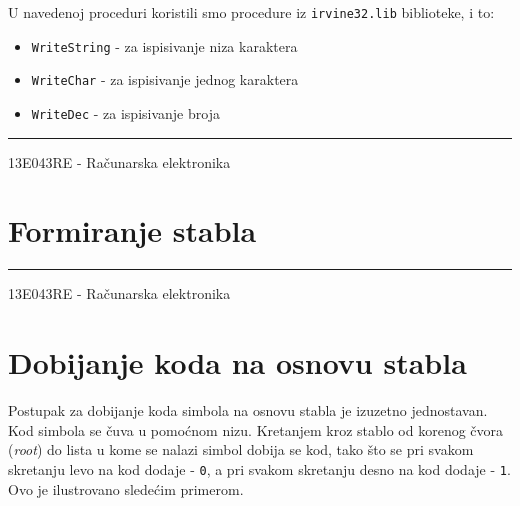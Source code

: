 \documentclass[a4paper, 12pt]{article}
\newcommand{\btmline}{
\vfill
\rule{0.9\textwidth}{0.4mm}
\begin{center}
13E043RE - Računarska elektronika
\end{center}}
\begin{document}
U navedenoj proceduri koristili smo procedure iz \verb|irvine32.lib| biblioteke, i to: 
\begin{itemize}
\setlength\itemsep{0.1em}
\item \verb|WriteString| - za ispisivanje niza karaktera
\item \verb|WriteChar| - za ispisivanje jednog karaktera
\item \verb|WriteDec| - za ispisivanje broja
\end{itemize}

\btmline\newpage

\section*{Formiranje stabla}

\btmline\newpage

\section*{Dobijanje koda na osnovu stabla}

Postupak za dobijanje koda simbola na osnovu stabla je izuzetno jednostavan. Kod simbola se čuva u pomoćnom nizu. Kretanjem kroz stablo od korenog čvora (\textit{root}) do lista u kome se nalazi simbol dobija se kod, tako što se pri svakom skretanju levo na kod dodaje - \verb|0|, a pri svakom skretanju desno na kod dodaje - \verb|1|. Ovo je ilustrovano sledećim primerom.
\end{document}
